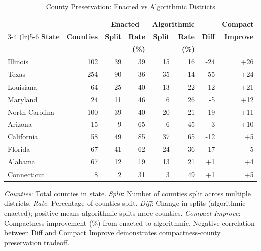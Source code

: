 \begin{table}[t]
\centering
\caption{County Preservation: Enacted vs Algorithmic Districts}
\label{tab:county_preservation}
\begin{tabular}{lrrrrrrr}
\toprule
& & \multicolumn{2}{c}{\textbf{Enacted}} & \multicolumn{2}{c}{\textbf{Algorithmic}} & & \textbf{Compact} \\
\cmidrule(lr){3-4} \cmidrule(lr){5-6}
\textbf{State} & \textbf{Counties} & \textbf{Split} & \textbf{Rate} & \textbf{Split} & \textbf{Rate} & \textbf{Diff} & \textbf{Improve} \\
& & & \textbf{(\%)} & & \textbf{(\%)} & & \\
\midrule
Illinois & 102 & 39 & 39 & 15 & 16 & -24 & +26 \\
Texas & 254 & 90 & 36 & 35 & 14 & -55 & +24 \\
Louisiana & 64 & 25 & 40 & 13 & 22 & -12 & +21 \\
Maryland & 24 & 11 & 46 & 6 & 26 & -5 & +12 \\
North Carolina & 100 & 39 & 40 & 20 & 21 & -19 & +11 \\
Arizona & 15 & 9 & 65 & 6 & 45 & -3 & +10 \\
California & 58 & 49 & 85 & 37 & 65 & -12 & +5 \\
Florida & 67 & 41 & 62 & 24 & 36 & -17 & -5 \\
Alabama & 67 & 12 & 19 & 13 & 21 & +1 & +4 \\
Connecticut & 8 & 2 & 31 & 3 & 49 & +1 & +5 \\
\bottomrule
\end{tabular}
\begin{tablenotes}
\small
\item \textit{Counties}: Total counties in state. \textit{Split}: Number of counties split across multiple districts. \textit{Rate}: Percentage of counties split. \textit{Diff}: Change in splits (algorithmic - enacted); positive means algorithmic splits more counties. \textit{Compact Improve}: Compactness improvement (\%) from enacted to algorithmic. Negative correlation between Diff and Compact Improve demonstrates compactness-county preservation tradeoff.
\end{tablenotes}
\end{table}
